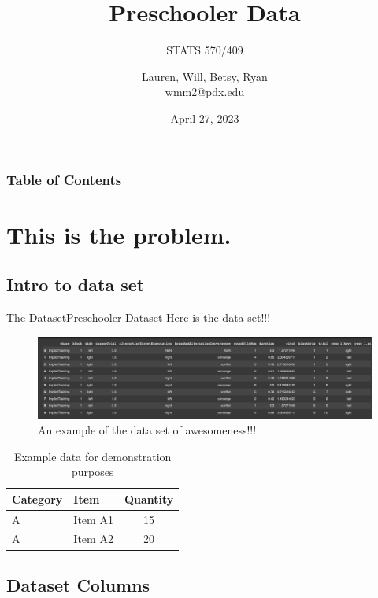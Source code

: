 \documentclass[
]{beamer}
\title[Mid-Project Update]{Preschooler Data}
\subtitle[Short Subtitle]{STATS 570/409}
\author[Data Whisperers]{Lauren, Will, Betsy, Ryan\texorpdfstring{\\}{, }wmm2@pdx.edu}
\institute[PSU]{Portland State University}
\date{April 27, 2023}
\begin{document}
\begin{frame}%
\maketitle
\end{frame}

\begin{frame}
\frametitle{Table of Contents}
\tableofcontents
\end{frame}
\section[Short Section 1 Name]{This is the problem.}
\subsection[Short Subsection 1 Name]{Intro to data set}

\begin{frame}{The Dataset}{Preschooler Dataset}
Here is the data set!!!
\begin{figure}[h]
\centering
\includegraphics[scale=0.25]{slides/images/dataset.png}
\caption{An example of the data set of awesomeness!!!}
\label{fig:x cubed graph}
\end{figure}

\begin{table}
  \begin{tabular}{llc}
    Category & Item & Quantity \\ \midrule
    A & Item A1 & 15 \\
    A & Item A2 & 20 \\
  \end{tabular}
  \caption{Example data for demonstration purposes}
\end{table}

\end{frame}


\subsection[Short Subsection 2 Name]{Dataset Columns}
\end{document}
